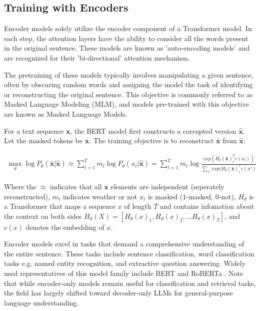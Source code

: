 \subsection{Training with Encoders}
Encoder models solely utilize the encoder component of a Transformer model. In each step, the attention layers have the ability to consider all the words present in the original sentence. These models are known as 'auto-encoding models' and are recognized for their 'bi-directional' attention mechanism.

The pretraining of these models typically involves manipulating a given sentence, often by obscuring random words and assigning the model the task of identifying or reconstructing the original sentence. This objective is commonly referred to as Masked Language Modeling (MLM), and models pre-trained with this objective are known as Masked Language Models.

For a text sequence $\textbf{x}$, the BERT model first constructs a corrupted version $\hat{\textbf{x}}$. Let the masked tokens be $\bar{\textbf{x}}$. The training objective is to reconstruct $\bar{\textbf{x}}$ from $\hat{\textbf{x}}$:

\begin{align}
\max_{\theta} \log P_{\theta}(\bar{\textbf{x}}|\hat{\textbf{x}})\approx \sum_{t=1}^T m_t \log P_{\theta}(x_t|\hat{\textbf{x}})
=\sum_{t=1}^T m_t \log \frac{exp(H_{\theta}(\hat{\textbf{x}})_t^Te(x_t))}{\sum_{x\prime} {exp(H_{\theta}(\hat{\textbf{x}})_t^Te(x\prime)}}
\end{align}

Where the $\approx$ indicates that all $\bar{\textbf{x}}$ elements are independent (seperately reconstructed), $m_t$ indicates weather or not $x_t$ is masked (1-masked, 0-not), $H_{\theta}$ is a Transformer that maps a sequence $x$ of length $T$ and contains infomation about the context on both sides $H_{\theta}(X)=[H_{\theta}(x)_1, H_{\theta}(x)_2,...H_{\theta}(x)_T]$, and $e(x)$ denotes the embedding of $x$.

Encoder models excel in tasks that demand a comprehensive understanding of the entire sentence. These tasks include sentence classification, word classification tasks e.g. named entity recognition, and extractive question answering. Widely used representatives of this model family include BERT \cite{devlin2018bert} and RoBERTa \cite{liu2019roberta}. Note that while encoder-only models remain useful for classification and retrieval tasks, the field has largely shifted toward decoder-only LLMs for general-purpose language understanding.

